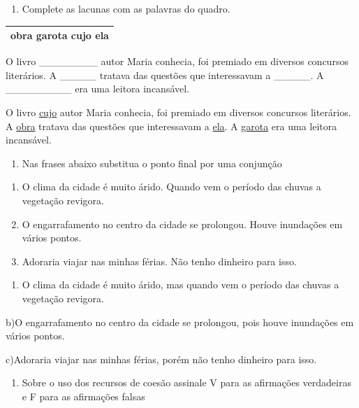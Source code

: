 {{\begin{enumerate}
\def\labelenumi{\arabic{enumi})}
\setcounter{enumi}{7}
\tightlist
\item
  Complete as lacunas com as palavras do quadro.
\end{enumerate}

\begin{longtable}[]{@{}l@{}}
\toprule
\endhead
obra garota cujo ela \\
\bottomrule
\end{longtable}

O livro \_\_\_\_\_\_\_\_ autor Maria conhecia, foi premiado em diversos
concursos literários. A \_\_\_\_\_ tratava das questões que interessavam
a \_\_\_\_\_. A \_\_\_\_\_\_\_\_\_ era uma leitora incansável.

O livro \uline{cujo} autor Maria conhecia, foi premiado em diversos
concursos literários. A \uline{obra} tratava das questões que
interessavam a \uline{ela}. A \uline{garota} era uma leitora incansável.

\begin{enumerate}
\def\labelenumi{\arabic{enumi})}
\setcounter{enumi}{8}
\tightlist
\item
  Nas frases abaixo substitua o ponto final por uma conjunção
\end{enumerate}

\begin{enumerate}
\def\labelenumi{\alph{enumi})}
\item
  O clima da cidade é muito árido. Quando vem o período das chuvas a
  vegetação revigora.
\item
  O engarrafamento no centro da cidade se prolongou. Houve inundações em
  vários pontos.
\item
  Adoraria viajar nas minhas férias. Não tenho dinheiro para isso.
\end{enumerate}

\begin{enumerate}
\def\labelenumi{\arabic{enumi}.}
\tightlist
\item
  O clima da cidade é muito árido, mas quando vem o período das chuvas a
  vegetação revigora.
\end{enumerate}

b)O engarrafamento no centro da cidade se prolongou, pois houve
inundações em vários pontos.

c)Adoraria viajar nas minhas férias, porém não tenho dinheiro para isso.

\begin{enumerate}
\def\labelenumi{\arabic{enumi})}
\setcounter{enumi}{9}
\tightlist
\item
  Sobre o uso dos recursos de coesão assinale V para as afirmações
  verdadeiras e F para as afirmações falsas
\end{enumerate}

}}
